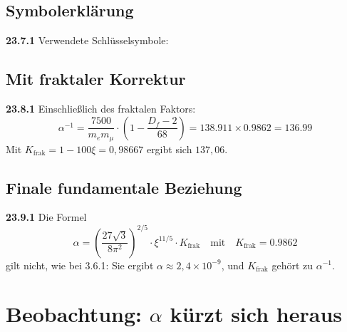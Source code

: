 \subsection{Symbolerklärung}

\noindent \textbf{23.7.1} Verwendete Schlüsselsymbole:


\subsection{Mit fraktaler Korrektur}

\noindent \textbf{23.8.1} Einschließlich des fraktalen Faktors:
\[
\alpha^{-1} = \frac{7500}{m_e m_\mu} \cdot \left(1 - \frac{D_f - 2}{68}\right) = 138.911 \times 0.9862 = 136.99
\]
Mit $K_{\text{frak}} = 1-100\xi = 0{,}98667$ ergibt sich $137{,}06$.

\subsection{Finale fundamentale Beziehung}

\noindent \textbf{23.9.1} Die Formel
\[
	\alpha = \left(\frac{27\sqrt{3}}{8\pi^2}\right)^{2/5} \cdot \xi^{11/5} \cdot K_{\text{frak}}
\quad \text{mit} \quad K_{\text{frak}} = 0.9862
\]
gilt nicht, wie bei 3.6.1: Sie ergibt $\alpha \approx 2{,}4\times10^{-9}$, und $K_{\text{frak}}$ gehört zu $\alpha^{-1}$.	


\section{Beobachtung: $\alpha$ kürzt sich heraus}

